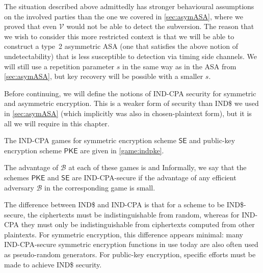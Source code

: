 The situation described above admittedly has stronger behavioural assumptions on the involved parties than the one we covered in \autoref{sec:asymASA}, where we proved that even $\mathcal{V}$ would not be able to detect the subversion. The reason that we wish to consider this more restricted context is that we will be able to construct a type~2 asymmetric ASA (one that satisfies the above notion of undetectability) that is less susceptible to detection via timing side channels. We will still use a repetition parameter $s$ in the same way as in the ASA from \autoref{sec:asymASA}, but key recovery will be possible with a smaller $s$.

Before continuing, we will define the notions of IND-CPA security for symmetric and asymmetric encryption. This is a weaker form of security than IND\$ we used in \autoref{sec:asymASA} (which implicitly was also in chosen-plaintext form), but it is all we will require in this chapter.

The IND-CPA games for symmetric encryption scheme $\mathsf{SE}$ and public-key encryption scheme $\mathsf{PKE}$ are given in \autoref{game:indpke}.

The advantage of $\mathcal{B}$ at each of these games is
and
Informally, we say that the schemes $\mathsf{PKE}$ and $\mathsf{SE}$ are IND-CPA-secure if the advantage of any efficient adversary $\mathcal{B}$ in the corresponding game is small.

The difference between IND\$ and IND-CPA is that for a scheme to be IND\$-secure, the ciphertexts must be indistinguishable from random, whereas for IND-CPA they must only be indistinguishable from ciphertexts computed from other plaintexts. For symmetric encryption, this difference appears minimal: many IND-CPA-secure symmetric encryption functions in use today are also often used as pseudo-random generators. For public-key encryption, specific efforts must be made to achieve IND\$ security.

